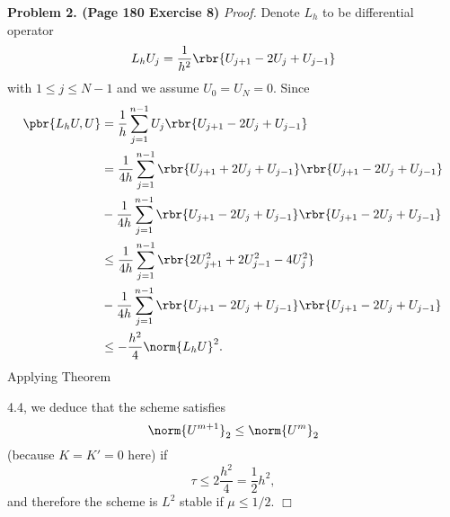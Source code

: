 \documentclass[english, nochinese]{pnote}
\begin{document}
\textbf{Problem 2. (Page 180 Exercise 8)} \textit{Proof.} Denote $L_h$ to be differential operator
\begin{equation}
L_h U_j = \frac{1}{h^2} \rbr{ U_{ j + 1 } - 2 U_j + U_{ j - 1 } }
\end{equation}
with $ 1 \le j \le N - 1 $ and we assume $ U_0 = U_N = 0 $. Since
\begin{equation}
\begin{split}
\pbr{ L_h U, U } &= \frac{1}{h} \sum_{ j = 1 }^{ n - 1 } U_j \rbr{ U_{ j + 1 } - 2 U_j + U_{ j - 1 } } \\
&= \frac{1}{ 4 h } \sum_{ j = 1 }^{ n - 1 } \rbr{ U_{ j + 1 } + 2 U_j + U_{ j - 1 } } \rbr{ U_{ j + 1 } - 2 U_j + U_{ j - 1 } } \\
&- \frac{1}{ 4 h } \sum_{ j = 1 }^{ n - 1 } \rbr{ U_{ j + 1 } - 2 U_j + U_{ j - 1 } } \rbr{ U_{ j + 1 } - 2 U_j + U_{ j - 1 } } \\
&\le \frac{1}{ 4 h } \sum_{ j = 1 }^{ n - 1 } \rbr{ 2 U_{ j + 1 }^2 + 2 U_{ j - 1 }^2 - 4 U_j^2 } \\
&- \frac{1}{ 4 h } \sum_{ j = 1 }^{ n - 1 } \rbr{ U_{ j + 1 } - 2 U_j + U_{ j - 1 } } \rbr{ U_{ j + 1 } - 2 U_j + U_{ j - 1 } } \\
&\le -\frac{h^2}{4} \norm{ L_h U }^2.
\end{split}
\end{equation}
Applying Theorem 

4.4, we deduce that the scheme satisfies
\begin{equation}
\norm{U^{ m + 1 }}_2 \le \norm{U^m}_2
\end{equation}
(because $ K = K' = 0 $ here) if
\begin{equation}
\tau \le 2 \frac{h^2}{4} = \frac{1}{2} h^2,
\end{equation}
and therefore the scheme is $L^2$ stable if $ \mu \le 1 / 2 $.
\hfill$\Box$
\end{document}
